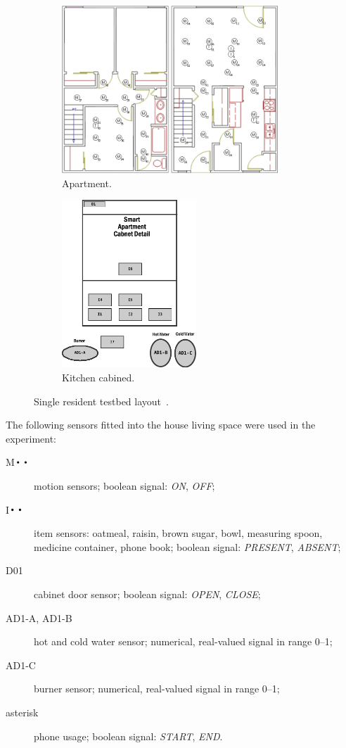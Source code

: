 \documentclass[10pt, a4paper, pdflatex, leqno, twoside, openright]{report}
\DeclareMathOperator*{\Bigcdot}{\scalerel*{\cdot}{\bigodot}}
\begin{document}
\begin{figure}[htb]
  \centering%
  \begin{subfigure}[b]{0.6\textwidth}
    \includegraphics[height=6.3cm]{gfx/Chinook_3_Bedroom_TH}
    \caption{Apartment.\label{fig:house:oner:a}}
  \end{subfigure}%
  \begin{subfigure}[b]{0.3\textwidth}
    \includegraphics[height=6.3cm]{gfx/Chinook_Cabinet}
    \caption{Kitchen cabined.\label{fig:house:oner:b}}
  \end{subfigure}%
  \caption[The sensor layout of the testbed.]{Single resident testbed layout~\citep{cook2009assessing}.\label{fig:house:oner}}
\end{figure}

The following sensors fitted into the house living space were used in the experiment:
\begin{description}
\item[M$\Bigcdot\Bigcdot$] motion sensors; boolean signal: \emph{ON}, \emph{OFF};
\item[I$\Bigcdot\Bigcdot$] item sensors: oatmeal, raisin, brown sugar, bowl, measuring spoon, medicine container, phone book; boolean signal: \emph{PRESENT}, \emph{ABSENT};
\item[D01] cabinet door sensor; boolean signal: \emph{OPEN}, \emph{CLOSE};
\item[AD1-A, AD1-B] hot and cold water sensor; numerical, real-valued signal in range 0--1;
\item[AD1-C] burner sensor; numerical, real-valued signal in range 0--1;
\item[asterisk] phone usage; boolean signal: \emph{START}, \emph{END}.
\end{description}
\end{document}
